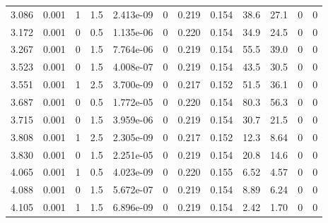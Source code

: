 \documentclass[preview]{standalone}
\begin{document}
{{\begin{tabular}{L{1.2cm}C{1.2cm} C{0.3cm}C{0.5cm} C{1.4cm}C{1.4cm} C{1.4cm}C{1.4cm} C{1.6cm}C{1.6cm} C{1.6cm}C{1.6cm}}
  3.086  &  0.001  & 1     & 1.5 &  2.413e-09  & 0  &  0.219&   0.154& 38.6 & 27.1   &  0 & 0  \\ 
  3.172  &  0.001  & 0     & 0.5 &  1.135e-06  & 0  &  0.220&   0.154& 34.9 & 24.5   &  0 & 0  \\ 
  3.267  &  0.001  & 0     & 1.5 &  7.764e-06  & 0  &  0.219&   0.154& 55.5 & 39.0   &  0 & 0  \\ 
  3.523  &  0.001  & 0     & 1.5 &  4.008e-07  & 0  &  0.219&   0.154& 43.5 & 30.5   &  0 & 0  \\ 
  3.551  &  0.001  & 1     & 2.5 &  3.700e-09  & 0  &  0.217&   0.152& 51.5 & 36.1   &  0 & 0  \\ 
  3.687  &  0.001  & 0     & 0.5 &  1.772e-05  & 0  &  0.220&   0.154& 80.3 & 56.3   &  0 & 0  \\ 
  3.715  &  0.001  & 0     & 1.5 &  3.959e-06  & 0  &  0.219&   0.154& 30.7 & 21.5   &  0 & 0  \\ 
  3.808  &  0.001  & 1     & 2.5 &  2.305e-09  & 0  &  0.217&   0.152& 12.3 & 8.64   &  0 & 0  \\ 
  3.830  &  0.001  & 0     & 1.5 &  2.251e-05  & 0  &  0.219&   0.154& 20.8 & 14.6   &  0 & 0  \\ 
  4.065  &  0.001  & 1     & 0.5 &  4.023e-09  & 0  &  0.220&   0.155& 6.52 & 4.57   &  0 & 0  \\ 
  4.088  &  0.001  & 0     & 1.5 &  5.672e-07  & 0  &  0.219&   0.154& 8.89 & 6.24   &  0 & 0  \\ 
  4.105  &  0.001  & 1     & 1.5 &  6.896e-09  & 0  &  0.219&   0.154& 2.42 & 1.70   &  0 & 0  \\ 
\hline 
\end{tabular} 

}}
\end{document}
